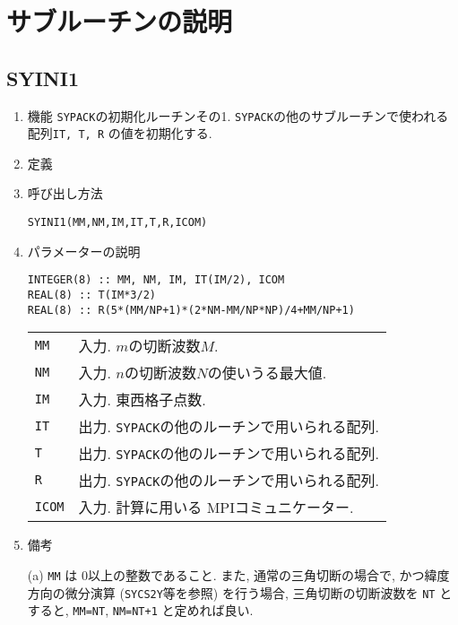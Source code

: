 \documentclass[a4j]{jsarticle}
\begin{document}

\section{サブルーチンの説明}

\subsection{SYINI1}

\begin{enumerate}

\item 機能
\texttt{SYPACK}の初期化ルーチンその1.
\texttt{SYPACK}の他のサブルーチンで使われる配列\texttt{IT, T, R}
の値を初期化する.

\item 定義

\item 呼び出し方法 
    
\texttt{SYINI1(MM,NM,IM,IT,T,R,ICOM)}
  
\item パラメーターの説明

\begin{verbatim}  
INTEGER(8) :: MM, NM, IM, IT(IM/2), ICOM
REAL(8) :: T(IM*3/2)
REAL(8) :: R(5*(MM/NP+1)*(2*NM-MM/NP*NP)/4+MM/NP+1)
\end{verbatim}  
    
\begin{tabular}{ll}
\texttt{MM} & 入力. $m$の切断波数$M$.\\
\texttt{NM} & 入力. $n$の切断波数$N$の使いうる最大値.\\
\texttt{IM} & 入力. 東西格子点数.\\
\texttt{IT} & 出力. \texttt{SYPACK}の他のルーチンで用いられる配列.\\
\texttt{T}  & 出力. \texttt{SYPACK}の他のルーチンで用いられる配列.\\
\texttt{R}  & 出力. \texttt{SYPACK}の他のルーチンで用いられる配列.\\
\texttt{ICOM} & 入力. 計算に用いる MPIコミュニケーター.
\end{tabular}

\item 備考

(a) \texttt{MM} は 0以上の整数であること.
  また, 通常の三角切断の場合で, かつ緯度方向の微分演算
  (\texttt{SYCS2Y}等を参照)
     を行う場合, 三角切断の切断波数を \texttt{NT} とすると,
     \texttt{MM=NT},  \texttt{NM=NT+1} と定めれば良い.
     

\end{enumerate}
\end{document}
